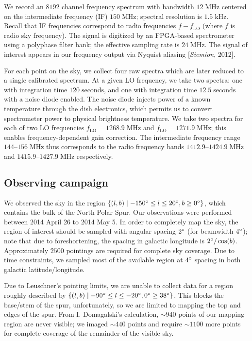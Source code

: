 \documentclass[10pt]{article}
\newcommand {\mt}{\mathrm}
\newcommand {\unit}[1]{\; \mt{#1}}
\begin{document}
We record an $8192$ channel frequency spectrum with bandwidth $12 \unit{MHz}$ centered on the intermediate frequency (IF) $150 \unit{MHz}$; spectral resolution is $1.5 \unit{kHz}$.  Recall that IF frequencies correspond to radio frequencies $f - f_{\mt{LO}}$ (where $f$ is radio sky frequency).  The signal is digitized by an FPGA-based spectrometer using a polyphase filter bank; the effective sampling rate is $24 \unit{MHz}$.  The signal of interest appears in our frequency output via Nyquist aliasing [\textit{Siemion}, 2012].

For each point on the sky, we collect four raw spectra which are later reduced to a single calibrated spectrum.  At a given LO frequency, we take two spectra: one with integration time $120 \unit{seconds}$, and one with integration time $12.5 \unit{seconds}$ with a noise diode enabled.  The noise diode injects power of a known temperature through the dish electronics, which permits us to convert spectrometer power to physical brightness temperature.  We take two spectra for each of two LO frequencies $f_{\mt{LO}} = 1268.9 \unit{MHz}$ and $f_{\mt{LO}} = 1271.9 \unit{MHz}$; this enables frequency-dependent gain correction.  The intermediate frequency range $144$--$156 \unit{MHz}$ thus corresponds to the radio frequency bands $1412.9$--$1424.9 \unit{MHz}$ and $1415.9$--$1427.9 \unit{MHz}$ respectively.

\subsection{Observing campaign}

We observed the sky in the region $\{(l,b) \mid -150\degree \leq l \leq 20\degree, b \geq 0\degree\}$, which contains the bulk of the North Polar Spur.
Our observations were performed between 2014 April 26 to 2014 May 5.  In order to completely map the sky, the region of interest should be sampled with angular spacing $2\degree$ (for beamwidth $4\degree$); note that due to foreshortening, the spacing in galactic longitude is $2\degree / \cos(b)$.  Approximately $2500$ pointings are required for complete sky coverage.  Due to time constraints, we sampled most of the available region at $4\degree$ spacing in both galactic latitude/longitude.

Due to Leuschner's pointing limits, we are unable to collect data for a region roughly described by $\{(l,b) \mid -90 \degree \leq l \leq -20\degree, 0\degree \geq 38\degree\}$.  This blocks the base/stem of the spur, unfortunately, so we are limited to mapping the top and edges of the spur.  From I. Domagalski's calculation, $\sim940$ points of our mapping region are never visible; we imaged $\sim440$ points and require $\sim1100$ more points for complete coverage of the remainder of the visible sky.
\end{document}
